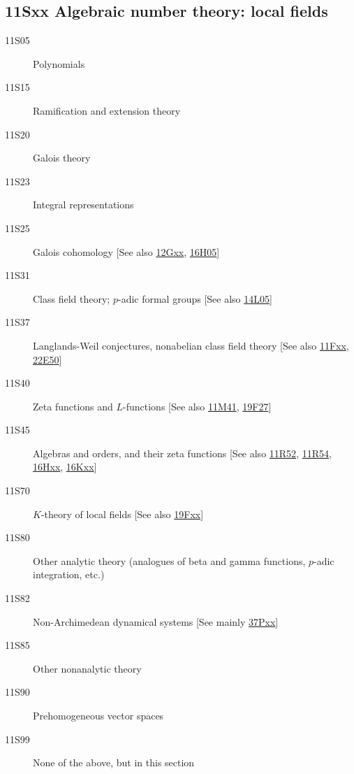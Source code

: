 \subsection*{11Sxx  Algebraic number theory: local fields }\label{11Sxx}
\begin{description}  
\item [11S05]\label{11S05} Polynomials
\item [11S15]\label{11S15} Ramification and extension theory
\item [11S20]\label{11S20} Galois theory
\item [11S23]\label{11S23} Integral representations
\item [11S25]\label{11S25} Galois cohomology [See also \hyperref[12Gxx]{12Gxx}, \hyperref[16H05]{16H05}]
\item [11S31]\label{11S31} Class field theory; $p$-adic formal groups [See also \hyperref[14L05]{14L05}]
\item [11S37]\label{11S37} Langlands-Weil conjectures, nonabelian class field theory [See also \hyperref[11Fxx]{11Fxx}, \hyperref[22E50]{22E50}]
\item [11S40]\label{11S40} Zeta functions and $L$-functions [See also \hyperref[11M41]{11M41}, \hyperref[19F27]{19F27}]
\item [11S45]\label{11S45} Algebras and orders, and their zeta functions [See also \hyperref[11R52]{11R52}, \hyperref[11R54]{11R54}, \hyperref[16Hxx]{16Hxx}, \hyperref[16Kxx]{16Kxx}]
\item [11S70]\label{11S70} $K$-theory of local fields [See also \hyperref[19Fxx]{19Fxx}]
\item [11S80]\label{11S80} Other analytic theory (analogues of beta and gamma functions, $p$-adic integration, etc.)
\item [11S82]\label{11S82} Non-Archimedean dynamical systems [See mainly \hyperref[37Pxx]{37Pxx}]
\item [11S85]\label{11S85} Other nonanalytic theory
\item [11S90]\label{11S90} Prehomogeneous vector spaces
\item [11S99]\label{11S99} None of the above, but in this section
\end{description}
